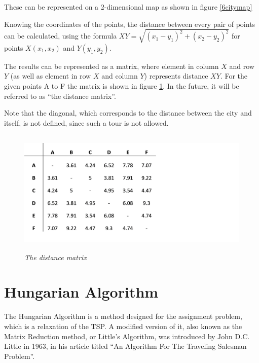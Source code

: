 These can be represented on a 2-dimensional map as shown in figure \ref{6citymap}



\par
Knowing the coordinates of the points, the distance between every pair of points can be calculated, using the formula $XY=\sqrt{(x_1-y_1)^2+(x_2-y_2)^2}$  for points $X(x_1, x_2)$ and $Y(y_1, y_2)$.

\vspace{5mm}

The results can be represented as a matrix, where element in column $X$ and row $Y$ (as well as element in row $X$ and column $Y$) represents distance $XY$. For the given points A to F the matrix is shown in figure \ref{distancematrix}. In the future, it will be referred to as “the distance matrix”.

\vspace{5mm}
Note that the diagonal, which corresponds to the distance between the city and itself, is not defined, since such a tour is not allowed.


\begin{figure}[bh] 
	\centering
	\includegraphics[height=6cm]{distancematrix}
	\caption{\textsl{The distance matrix}}
	\label{distancematrix}
\end{figure}



\section{Hungarian Algorithm}

The Hungarian Algorithm is a method designed for the assignment problem, which is a relaxation of the TSP. A modified version of it, also known as the Matrix Reduction method, or Little’s Algorithm, was introduced by John D.C. Little in 1963, in his article titled “An Algorithm For The Traveling Salesman Problem”.

